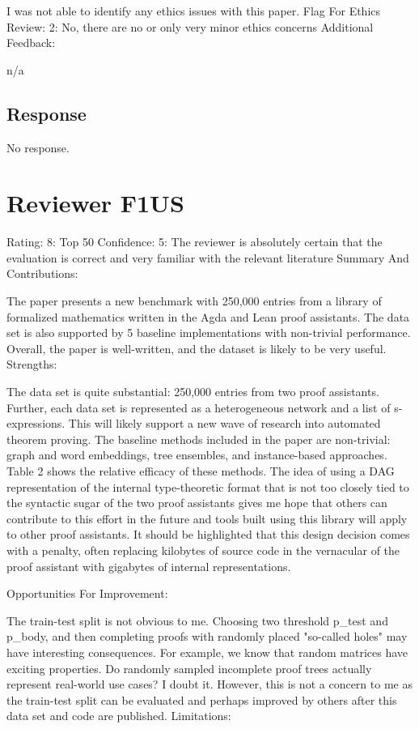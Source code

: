 \documentclass{article}
\begin{document}
I was not able to identify any ethics issues with this paper.
Flag For Ethics Review: 2: No, there are no or only very minor ethics concerns
Additional Feedback:

n/a

\subsection{Response}

No response.


\section{Reviewer F1US}

Rating: 8: Top 50%
Confidence: 5: The reviewer is absolutely certain that the evaluation is correct and very familiar with the relevant literature
Summary And Contributions:

The paper presents a new benchmark with 250,000 entries from a library of formalized mathematics written in the Agda and Lean proof assistants. The data set is also supported by 5 baseline implementations with non-trivial performance. Overall, the paper is well-written, and the dataset is likely to be very useful.
Strengths:

    The data set is quite substantial: 250,000 entries from two proof assistants. Further, each data set is represented as a heterogeneous network and a list of s-expressions. This will likely support a new wave of research into automated theorem proving.
    The baseline methods included in the paper are non-trivial: graph and word embeddings, tree ensembles, and instance-based approaches. Table 2 shows the relative efficacy of these methods.
    The idea of using a DAG representation of the internal type-theoretic format that is not too closely tied to the syntactic sugar of the two proof assistants gives me hope that others can contribute to this effort in the future and tools built using this library will apply to other proof assistants. It should be highlighted that this design decision comes with a penalty, often replacing kilobytes of source code in the vernacular of the proof assistant with gigabytes of internal representations.

Opportunities For Improvement:

The train-test split is not obvious to me. Choosing two threshold p\_test and p\_body, and then completing proofs with randomly placed "so-called holes" may have interesting consequences. For example, we know that random matrices have exciting properties. Do randomly sampled incomplete proof trees actually represent real-world use cases? I doubt it. However, this is not a concern to me as the train-test split can be evaluated and perhaps improved by others after this data set and code are published.
Limitations:
\end{document}

